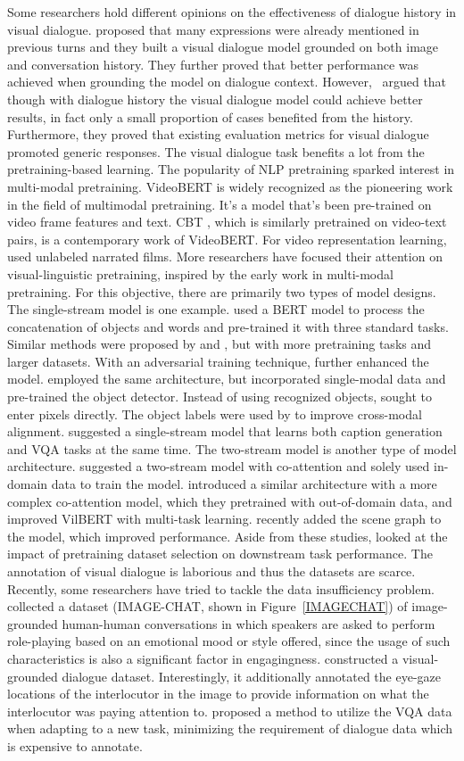 Some researchers hold different opinions on the effectiveness of dialogue history in visual dialogue.  proposed that many expressions were already mentioned in previous turns and they built a visual dialogue model grounded on both image and conversation history. They further proved that better performance was achieved when grounding the model on dialogue context. However,~ argued that though with dialogue history the visual dialogue model could achieve better results, in fact only a small proportion of cases benefited from the history. Furthermore, they proved that existing evaluation metrics for visual dialogue promoted generic responses. 
The visual dialogue task benefits a lot from the pretraining-based learning. The popularity of NLP pretraining sparked interest in multi-modal pretraining. VideoBERT  is widely recognized as the pioneering work in the field of multimodal pretraining. It's a model that's been pre-trained on video frame features and text. CBT , which is similarly pretrained on video-text pairs, is a contemporary work of VideoBERT. For video representation learning,  used unlabeled narrated films. More researchers have focused their attention on visual-linguistic pretraining, inspired by the early work in multi-modal pretraining. For this objective, there are primarily two types of model designs. The single-stream model  is one example.  used a BERT model to process the concatenation of objects and words and pre-trained it with three standard tasks. Similar methods were proposed by  and , but with more pretraining tasks and larger datasets. With an adversarial training technique,  further enhanced the model.  employed the same architecture, but incorporated single-modal data and pre-trained the object detector. Instead of using recognized objects,  sought to enter pixels directly. The object labels were used by  to improve cross-modal alignment.  suggested a single-stream model that learns both caption generation and VQA tasks at the same time. The two-stream model  is another type of model architecture.  suggested a two-stream model with co-attention and solely used in-domain data to train the model.  introduced a similar architecture with a more complex co-attention model, which they pretrained with out-of-domain data, and  improved VilBERT with multi-task learning.  recently added the scene graph to the model, which improved performance. Aside from these studies,  looked at the impact of pretraining dataset selection on downstream task performance.
The annotation of visual dialogue is laborious and thus the datasets are scarce. Recently, some researchers have tried to tackle the data insufficiency problem.  collected a dataset (IMAGE-CHAT, shown in Figure~\ref{IMAGECHAT}) of image-grounded human-human conversations in which speakers are asked to perform role-playing based on an emotional mood or style offered, since the usage of such characteristics is also a significant factor in engagingness.  constructed a visual-grounded dialogue dataset. Interestingly, it additionally annotated the eye-gaze locations of the interlocutor in the image to provide information on what the interlocutor was paying attention to.  proposed a method to utilize the VQA data when adapting to a new task, minimizing the requirement of dialogue data which is expensive to annotate.

